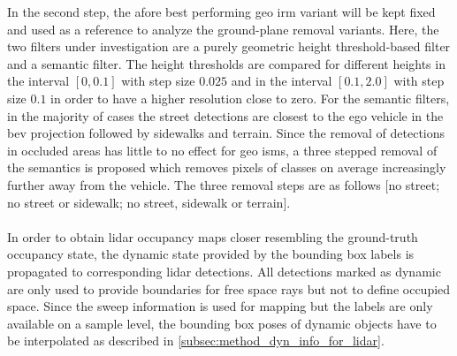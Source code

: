 In the second step, the afore best performing geo \gls{irm} variant will be kept fixed and used as a reference to analyze the ground-plane removal variants. Here, the two filters under investigation are a purely geometric height threshold-based filter and a semantic filter. The height thresholds are compared for different heights in the interval $[0,0.1]$ with step size $0.025$ and in the interval $[0.1,2.0]$ with step size $0.1$ in order to have a higher resolution close to zero. For the semantic filters, in the majority of cases the street detections are closest to the ego vehicle in the \gls{bev} projection followed by sidewalks and terrain. Since the removal of detections in occluded areas has little to no effect for geo \gls{ism}s, a three stepped removal of the semantics is proposed which removes pixels of classes on average increasingly further away from the vehicle. The three removal steps are as follows $[$no street; no street or sidewalk; no street, sidewalk or terrain$]$.
\\\\
In order to obtain lidar occupancy maps closer resembling the ground-truth occupancy state, the dynamic state provided by the bounding box labels is propagated to corresponding lidar detections. All detections marked as dynamic are only used to provide boundaries for free space rays but not to define occupied space. Since the sweep information is used for mapping but the labels are only available on a sample level, the bounding box poses of dynamic objects have to be interpolated as described in \ref{subsec:method_dyn_info_for_lidar}. 
%
